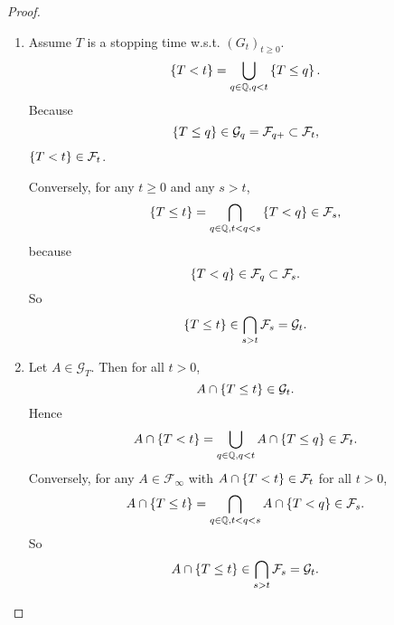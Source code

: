 \begin{proof}
    \begin{enumerate}[label=(\arabic{*})]
        \item Assume $T$ is a stopping time w.s.t. $(G_t)_{t \geq 0}$.
        \begin{equation*}
            \left\{T < t\right\} = \bigcup_{q \in \mathbb{Q},q < t} \left\{T \leq q\right\}.
        \end{equation*}
        Because
        \begin{equation*}
            \left\{T \leq q\right\} \in \mathcal{G}_q = \mathcal{F}_{q+} \subset \mathcal{F}_t,
        \end{equation*}
        $\left\{T < t\right\} \in \mathcal{F}_t$.

        \noindent Conversely, for any $t \geq 0$ and any $s > t$,
        \begin{equation*}
            \left\{T \leq t\right\} = \bigcap_{q \in \mathbb{Q}, t < q < s} \left\{T < q\right\} \in \mathcal{F}_s,
        \end{equation*}
        because
        \begin{equation*}
            \left\{T < q\right\} \in \mathcal{F}_q \subset \mathcal{F}_s.
        \end{equation*}
        So
        \begin{equation*}
            \left\{T \leq t\right\} \in \bigcap_{s > t}\mathcal{F}_s = \mathcal{G}_t.
        \end{equation*}

        \item Let $A \in \mathcal{G}_T$. Then for all $t > 0$,
        \begin{equation*}
            A \cap \left\{T \leq t\right\} \in \mathcal{G}_t.
        \end{equation*}
        Hence
        \begin{equation*}
            A \cap \left\{T < t\right\} = \bigcup_{q \in \mathbb{Q},q < t} A \cap \left\{T \leq q\right\} \in \mathcal{F}_t.
        \end{equation*}
        Conversely, for any $A \in \mathcal{F}_\infty$ with $A \cap \left\{T < t\right\} \in \mathcal{F}_t$ for all $t > 0$,
        \begin{equation*}
            A \cap \left\{T \leq t\right\} = \bigcap_{q \in \mathbb{Q}, t < q < s} A \cap \left\{T < q\right\} \in \mathcal{F}_s.
        \end{equation*} 
        So
        \begin{equation*}
            A \cap \left\{T \leq t\right\} \in \bigcap_{s > t}\mathcal{F}_s = \mathcal{G}_t. \qedhere
        \end{equation*}
    \end{enumerate}
\end{proof}

